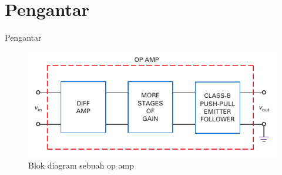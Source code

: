 \section{Pengantar}
\begin{frame}{Pengantar}
\begin{figure}
	\centering
	\includegraphics[width=0.7\linewidth]{gambar/fig-16.1}
	\caption{Blok diagram sebuah op amp}
	\label{fig:fig-16}
\end{figure}

\end{frame}